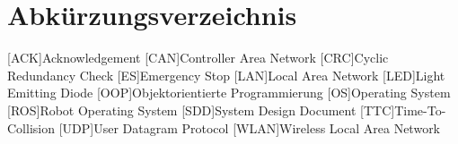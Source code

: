 \section*{Abkürzungsverzeichnis}

\begin{acronym}[WLAN]
  [ACK]{Acknowledgement}
  [CAN]{Controller Area Network}
  [CRC]{Cyclic Redundancy Check}
  [ES]{Emergency Stop}
  [LAN]{Local Area Network}
  [LED]{Light Emitting Diode}
  [OOP]{Objektorientierte Programmierung}
  [OS]{Operating System}
  [ROS]{Robot Operating System}
  [SDD]{System Design Document}
  [TTC]{Time-To-Collision}
  [UDP]{User Datagram Protocol}
  [WLAN]{Wireless Local Area Network}
\end{acronym}
